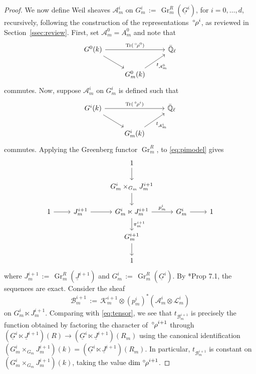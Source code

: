 \documentclass[10pt]{amsart}
\theoremstyle{plain}
\theoremstyle{definition}
\newcommand{\EE}{\mathbb{\bar Q}_\ell}
\newcommand{\Fq}{k}
\DeclareMathOperator{\Gr}{Gr}
\DeclareMathOperator{\trace}{Tr}
\newcommand{\ceq}{{\, :=\, }}
\newcommand{\trFrob}[1]{t_{#1}}
\newcommand{\cs}[1]{{\mathcal{#1}}}
\newcommand{\orho}{{\,^\circ \hskip-1pt \rho}}
\begin{document}
\begin{proof}
We now define Weil sheaves $\cs{A}^i_m$ on $G_m^i \ceq \Gr^{R}_m(\underline{G}^{i})$, for $i=0,\ldots ,d$, recursively, following the construction of the representations $\orho^i$, as reviewed in Section~\ref{ssec:review}.
First, set $\cs{A}_m^0 = A_m^0$ and note that 
\[
\begin{tikzcd}
G^0(\Fq) \arrow{rr}{\trace(\orho^0)} \arrow{rd} && \EE\\
& G^0_m(\Fq) \arrow{ru}[swap]{\trFrob{\cs{A}_m^0}} & 
\end{tikzcd}
\]
commutes.
Now, suppose $\cs{A}^i_m$ on $G_m^i$ is defined such that
\[
\begin{tikzcd}
G^i(\Fq) \arrow{rr}{\trace(\orho^i)} \arrow{rd} && \EE\\
& G_m^i(\Fq) \arrow{ru}[swap]{\trFrob{\cs{A}_m^i}} & 
\end{tikzcd}
\]
commutes.
Applying the Greenberg functor $\Gr^{R}_m$, to \eqref{eq:pimodel} gives
\begin{equation}\label{eq:pi}
\begin{tikzcd}
\ && 1 \arrow{d} && \\
\ && G_m^{i}\times_{G_m} J_m^{i+1} \arrow{d} && \\
1 \arrow{r} &J_m^{i+1} \arrow{r} & G_m^i \ltimes J_m^{i+1} \arrow{d}{\pi_m^{i+1}} \arrow{r}{p_m^{i}} & G_m^i \arrow{r} & 1\\
&& G_m^{i+1} \arrow{d} && \\
&& 1 && 
\end{tikzcd}
\end{equation}
where $J_m^{i+1} \ceq \Gr^{R}_m(\underline{J}^{i+1})$ and $G_m^{i} \ceq \Gr^{R}_m(\underline{G}^{i})$.
By \cite{bertapelle-gonzales:Greenberg}*{Prop 7.1}, the sequences are exact.
Consider the sheaf 
\[
\cs{B}_m^{i+1} \ceq \cs{K}_m^{i+1} \otimes (p_m^{i})^*(\cs{A}_m^{i}\otimes \cs{L}_m^{i})
\]
on $G_m^{i}\ltimes J_m^{i+1}$.
Comparing with \eqref{eq:tensor}, we see that $\trFrob{\cs{B}_m^{i+1}}$ is precisely the function obtained by factoring the character of $\orho^{i+1}$ through $(\underline{G}^{i}\ltimes \underline{J}^{i+1})(R) \to (\underline{G}^{i}\ltimes \underline{J}^{i+1})(R_m)$ using the canonical identification $(G_m^{i}\times_{G_m} J_m^{i+1})(\Fq) =  (\underline{G}^{i}\ltimes \underline{J}^{i+1})(R_m)$. 
In particular, $\trFrob{\cs{B}^{i+1}_m}$ is constant on $(G_m^{i}\times_{G_m} J_m^{i+1})(\Fq)$, taking the value $\dim \orho^{i+1}$.

\end{proof}
\end{document}
